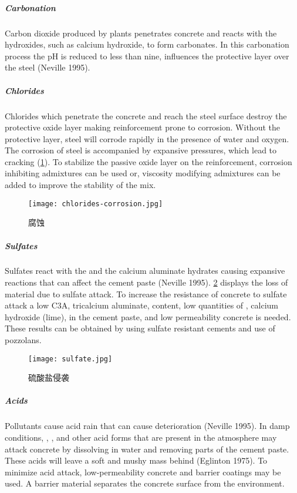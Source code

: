 \subparagraph{Carbonation}
Carbon dioxide produced by plants penetrates concrete and reacts with the hydroxides, such as calcium
hydroxide, to form carbonates. In this carbonation process the pH is reduced to less than nine, influences the
protective layer over the steel (Neville 1995).

\subparagraph{Chlorides}
Chlorides which penetrate the concrete and reach the steel surface destroy the protective oxide layer making
reinforcement prone to corrosion. Without the protective layer, steel will corrode rapidly in the presence of water
and oxygen. The corrosion of steel is accompanied by expansive pressures, which lead to cracking (\cref{fig:chlorides-corrosion}). To
stabilize the passive oxide layer on the reinforcement, corrosion inhibiting admixtures can be used or, viscosity
modifying admixtures can be added to improve the stability of the mix.

\begin{figure}
  \texttt{[image: chlorides-corrosion.jpg]}
  \caption{腐蚀}
  \label{fig:chlorides-corrosion}
\end{figure}

\subparagraph{Sulfates}
Sulfates react with the  and the calcium aluminate hydrates causing expansive reactions that can affect
the cement paste (Neville 1995). \cref{fig:sulfate} displays the loss of material due to sulfate attack. To increase the
resistance of concrete to sulfate attack a low C3A, tricalcium aluminate, content, low quantities of , calcium
hydroxide (lime), in the cement paste, and low permeability concrete is needed. These results can be obtained by
using sulfate resistant cements and use of pozzolans.

\begin{figure}
  \texttt{[image: sulfate.jpg]}
  \caption{硫酸盐侵袭}
  \label{fig:sulfate}
\end{figure}


\subparagraph{Acids}
Pollutants cause acid rain that can cause deterioration (Neville 1995). In damp conditions, , ,  and other acid forms that are present in the atmosphere may attack concrete by dissolving in water and removing parts of the cement paste. These acids will leave a soft and mushy mass behind (Eglinton 1975). To minimize acid attack, low-permeability concrete and barrier coatings may be used. A barrier material separates the concrete surface from
the environment.


